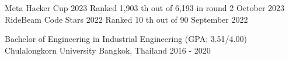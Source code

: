 \documentclass[]{awesome-cv}
\begin{document}
\begin{cvhonors}
	\cvhonor
	{Meta Hacker Cup 2023}
	{Ranked 1,903 th out of 6,193 in round 2}
	{October 2023}
	\cvhonor
	{RideBeam Code Stars 2022}
	{Ranked 10 th out of 90}
	{September 2022}
\end{cvhonors}

\begin{cventries}
	\cventry
	{Bachelor of Engineering in Industrial Engineering (GPA: 3.51/4.00)}
	{Chulalongkorn University}
	{Bangkok, Thailand}
	{2016 - 2020}
	{}
\end{cventries}

\let\clearpage\relax
\end{document}
